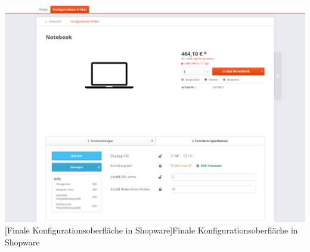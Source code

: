 \begin{appendix}
\vspace{1em}
\begin{minipage}{\linewidth}
	\centering
	\includegraphics[width=1\linewidth]{Abbildungen/finaleKonfigurationsOberflaeche.PNG}
	[Finale Konfigurationsoberfläche in Shopware]{Finale Konfigurationsoberfläche in Shopware}
	\label{app:finaleKonfigurationsOberflaeche}
\end{minipage}
\vspace{1em}

\end{appendix}